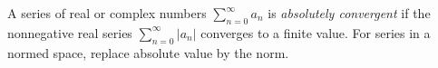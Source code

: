 
A series of real or complex numbers $\sum_{n=0}^\infty a_n$ is \emph{absolutely convergent} if the nonnegative real series $\sum_{n=0}^\infty |a_n|$ converges to a finite value. For series in a normed space, replace absolute value by the norm.
